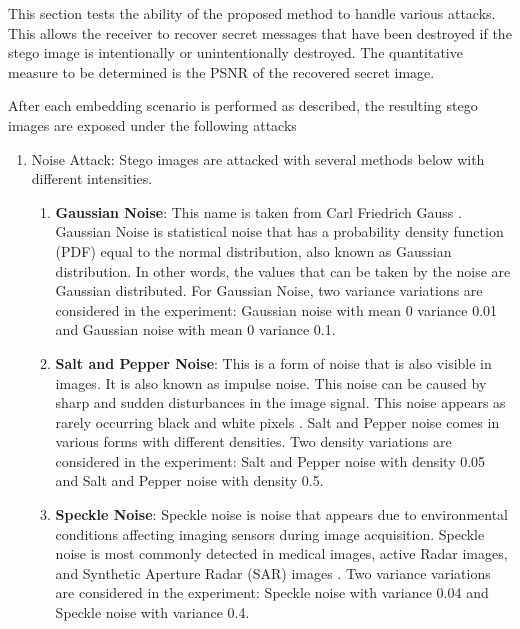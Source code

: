 \documentclass{ittelkom}
\begin{document}
This section tests the ability of the proposed method to handle various
attacks. This allows the receiver to recover secret messages that have been
destroyed if the stego image is intentionally or unintentionally destroyed. The
quantitative measure to be determined is the PSNR of the recovered secret
image.

After each embedding scenario is performed as described, the resulting stego
images are exposed under the following attacks


\begin{enumerate}
    \item Noise Attack: Stego images are attacked with several methods below with
          different intensities.
          \begin{enumerate}
              \item \textbf{Gaussian Noise}: This name is taken from Carl Friedrich Gauss
                    \cite{selamistudy}. Gaussian Noise is statistical noise that has a probability
                    density function (PDF) equal to the normal distribution, also known as
                    Gaussian distribution. In other words, the values that can be taken by the
                    noise are Gaussian distributed. For Gaussian Noise, two variance variations
                    are considered in the experiment: Gaussian noise with mean 0 variance 0.01
                    and Gaussian noise with mean 0 variance 0.1.
              \item \textbf{Salt and Pepper Noise}: This is a form of noise that is also visible
                    in images. It is also known as impulse noise. This noise can be caused by
                    sharp and sudden disturbances in the image signal. This noise appears as
                    rarely occurring black and white pixels \cite{kaisar2008salt}. Salt and
                    Pepper noise comes in various forms with different densities. Two density
                    variations are considered in the experiment: Salt and Pepper noise with
                    density 0.05 and Salt and Pepper noise with density 0.5.
              \item \textbf{Speckle Noise}: Speckle noise is noise that appears due to
                    environmental conditions affecting imaging sensors during image acquisition.
                    Speckle noise is most commonly detected in medical images, active Radar
                    images, and Synthetic Aperture Radar (SAR) images \cite{mansourpour2006effects}.
                    Two variance variations are considered in the experiment: Speckle noise with
                    variance 0.04 and Speckle noise with variance 0.4.
          \end{enumerate}


\end{enumerate}
\end{document}

